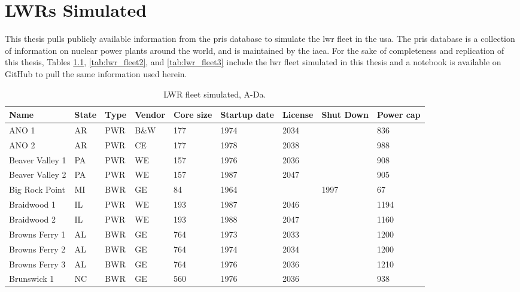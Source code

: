 \chapter{LWRs Simulated}
\label{app:lwrs}

This thesis pulls publicly available information from the \gls{pris} database \cite{IAEA_PRIS} to simulate the \gls{lwr} fleet in the \gls{usa}. The \gls{pris} database is a collection of information on nuclear power plants around the world, and is maintained by the \gls{iaea}. For the sake of completeness and replication of this thesis, Tables \ref{tab:lwr_fleet_1}, \ref{tab:lwr_fleet2}, and \ref{tab:lwr_fleet3} include the \gls{lwr} fleet simulated in this thesis and a notebook is available on GitHub \cite{ryan_transition} to pull the same information used herein.


\begin{table}[H]
    \centering
    \caption{LWR fleet simulated, A-Da.}
    \label{tab:lwr_fleet_1}
    \begin{tabular}{l l l l l l l l l}
    \hline
    \textbf{Name} & \textbf{State} & \textbf{Type} & \textbf{Vendor} & \textbf{Core size} & \textbf{Startup date} & \textbf{License} & \textbf{Shut Down} & \textbf{Power cap} \\
    \hline
    ANO 1                 &AR & PWR & B\&W & 177 & 1974 & 2034 &      & 836 \\
    ANO 2                 &AR & PWR & CE   & 177 & 1978 & 2038 &      & 988 \\
    Beaver Valley 1       &PA & PWR & WE   & 157 & 1976 & 2036 &      & 908 \\
    Beaver Valley 2       &PA & PWR & WE   & 157 & 1987 & 2047 &      & 905 \\
    Big Rock Point        &MI & BWR & GE   & 84  & 1964 &      & 1997 & 67  \\
    Braidwood 1           &IL & PWR & WE   & 193 & 1987 & 2046 &      & 1194\\
    Braidwood 2           &IL & PWR & WE   & 193 & 1988 & 2047 &      & 1160\\
    Browns Ferry 1        &AL & BWR & GE   & 764 & 1973 & 2033 &      & 1200\\
    Browns Ferry 2        &AL & BWR & GE   & 764 & 1974 & 2034 &      & 1200\\
    Browns Ferry 3        &AL & BWR & GE   & 764 & 1976 & 2036 &      & 1210\\
    Brunswick 1           &NC & BWR & GE   & 560 & 1976 & 2036 &      & 938 \\

\end{tabular}
\end{table}
